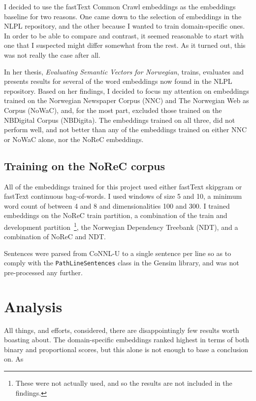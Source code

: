 \documentclass{acl2020}
\begin{document}
I decided to use the fastText Common Crawl embeddings as the embeddings baseline for two reasons. One came down to the selection of embeddings in the NLPL repository, and the other  because I wanted to train domain-specific ones. In order to be able to compare and contrast, it seemed reasonable to start with one that I suspected might differ somewhat from the rest. As it turned out, this was not really the case after all.

In her thesis, \emph{Evaluating Semantic Vectors for Norwegian}, \citet{StadsnesCathrine2018ESVf} trains, evaluates and presents results for several of the word embeddings now found in the NLPL repository. Based on her findings, I decided to focus my attention on embeddings trained on the Norwegian Newspaper Corpus (NNC) and The Norwegian Web as Corpus (NoWaC), and, for the most part, excluded those trained on the NBDigital Corpus (NBDigita). The embeddings trained on all three, did not perform well, and not better than any of the embeddings trained on either NNC or NoWaC alone, nor the NoReC embeddings.

\subsection{Training on the NoReC corpus}
\label{subsec:norec-emb}

All of the embeddings trained for this project used either fastText skipgram or fastText continuous bag-of-words. I used windows of size 5 and 10, a minimum word count of between 4 and 8 and dimensionalities 100 and 300. I trained embeddings on the NoReC train partition, a combination of the train and development partition~\footnote{These were not actually used, and so the results are not included in the findings.}, the Norwegian Dependency Treebank (NDT), and a combination of NoReC and NDT.

Sentences were parsed from CoNNL-U to a single sentence per line so as to comply with the {\small\verb|PathLineSentences|} class in the Gensim library, and was not pre-processed any further.


\section{Analysis}
\label{sec:error-analysis}

All things, and efforts, considered, there are disappointingly few results worth boasting about. The domain-specific embeddings ranked highest in terms of both binary and proportional scores, but this alone is not enough to base a conclusion on. As
\end{document}
